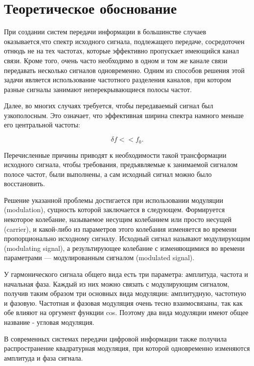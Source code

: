 \documentclass[a4paper,14pt]{article}
\begin{document}
\section{Теоретическое обоснование}

\hspace{0,5cm}При создании систем передачи информации в большинстве случаев оказывается,что спектр исходного сигнала, подлежащего передаче, сосредоточен отнюдь не на тех частотах, которые эффективно пропускает имеющийся канал связи. Кроме того, очень часто необходимо в одном и том же канале связи передавать несколько сигналов одновременно. Одним из способов решения этой задачи является использование частотного разделения каналов, при котором разные сигналы занимают неперекрывающиеся полосы частот.

\hspace{0,5cm}Далее, во многих случаях требуется, чтобы передаваемый сигнал был узкополосным. Это означает, что эффективная ширина спектра намного меньше его центральной частоты:

\[\delta f << f_0.\]

\hspace{0,5cm}Перечисленные причины приводят к необходимости такой трансформации исходного сигнала, чтобы требования, предъявляемые к занимаемой сигналом полосе частот, были выполнены, а сам исходный сигнал можно было восстановить.

\hspace{0,5cm}Решение указанной проблемы достигается при использовании модуляции (modulation), сущность которой заключается в следующем. Формируется некоторое колебание, называемое несущим колебанием или просто несущей (carrier), и какой-либо из параметров этого колебания изменяется во времени пропорционально исходному сигналу. Исходный сигнал называют модулирующим (modulating signal), а результирующее колебание с изменяющимися во времени параметрами — модулированным сигналом (modulated signal).

\hspace{0,5cm} У гармонического сигнала общего вида есть три параметра: амплитуда, частота и начальная фаза. Каждый из них можно связать с модулирующим сигналом, получив таким образом три основных вида модуляции: амплитудную, частотную и фазовую. Частотная и фазовая модуляция очень тесно взаимосвязаны, так как обе влияют на оргумент функции cos. Поэтому два вида модуляции имеют общее название - угловая модуляция.

\hspace{0,5cm} В современных системах передачи цифровой информации также получила распространение квадратурная модуляция, при которой одновременно изменяются амплитуда и фаза сигнала.
\end{document}
